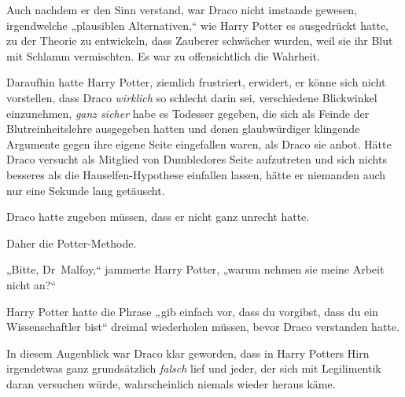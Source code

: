 Auch nachdem er den Sinn verstand, war Draco nicht imstande gewesen, irgendwelche „plausiblen Alternativen,“ wie Harry Potter es ausgedrückt hatte, zu der Theorie zu entwickeln, dass Zauberer schwächer wurden, weil sie ihr Blut mit Schlamm vermischten. Es war zu offensichtlich die Wahrheit.

Daraufhin hatte Harry Potter, ziemlich frustriert, erwidert, er könne sich nicht vorstellen, dass Draco \emph{wirklich} so schlecht darin sei, verschiedene Blickwinkel einzunehmen, \emph{ganz sicher} habe es Todesser gegeben, die sich als Feinde der Blutreinheitslehre ausgegeben hatten und denen glaubwürdiger klingende Argumente gegen ihre eigene Seite eingefallen waren, als Draco sie anbot. Hätte Draco versucht als Mitglied von Dumbledores Seite aufzutreten und sich nichts besseres als die Hauselfen-Hypothese einfallen lassen, hätte er niemanden auch nur eine Sekunde lang getäuscht.

Draco hatte zugeben müssen, dass er nicht ganz unrecht hatte.

Daher die Potter-Methode.

„Bitte, Dr~Malfoy,“ jammerte Harry Potter, „warum nehmen sie meine Arbeit nicht an?“

Harry Potter hatte die Phrase „gib einfach vor, dass du vorgibst, dass du ein Wissenschaftler bist“ dreimal wiederholen müssen, bevor Draco verstanden hatte.

In diesem Augenblick war Draco klar geworden, dass in Harry Potters Hirn irgendetwas ganz grundsätzlich \emph{falsch} lief und jeder, der sich mit Legilimentik daran versuchen würde, wahrscheinlich niemals wieder heraus käme.

